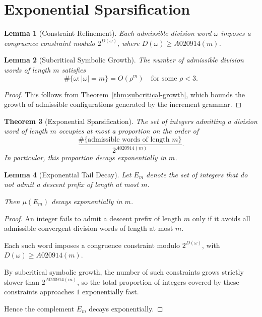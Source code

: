 \documentclass[12pt, oneside]{article}
\numberwithin{equation}{section}
\theoremstyle{definition}
\theoremstyle{plain}
\newtheorem{theorem}{Theorem}[section]
\newtheorem{lemma}[theorem]{Lemma}
\theoremstyle{remark}
\begin{document}
\section{Exponential Sparsification}
\label{sec:exponential-sparsification}

\begin{lemma}[Constraint Refinement]
Each admissible division word $\omega$ imposes a congruence constraint
modulo $2^{D(\omega)}$, where $D(\omega) \ge A020914(m)$.
\end{lemma}

\begin{lemma}[Subcritical Symbolic Growth]
The number of admissible division words of length $m$ satisfies
\[
\#\{\omega : |\omega|=m\} = O(\rho^m)
\quad \text{for some } \rho < 3.
\]
\end{lemma}

\begin{proof}
This follows from Theorem~\ref{thm:subcritical-growth}, which bounds the growth
of admissible configurations generated by the increment grammar.
\end{proof}

\begin{theorem}[Exponential Sparsification]
The set of integers admitting a division word of length $m$ occupies at most
a proportion on the order of
\[
\frac{\#\{\text{admissible words of length } m\}}{2^{A020914(m)}}.
\]
In particular, this proportion decays exponentially in $m$.
\end{theorem}

\begin{lemma}[Exponential Tail Decay]
Let $E_m$ denote the set of integers that do not admit a descent prefix
of length at most $m$.

Then $\mu(E_m)$ decays exponentially in $m$.
\end{lemma}

\begin{proof}
An integer fails to admit a descent prefix of length $m$ only if it avoids
all admissible convergent division words of length at most $m$.

Each such word imposes a congruence constraint modulo $2^{D(\omega)}$,
with $D(\omega) \ge A020914(m)$.

By subcritical symbolic growth, the number of such constraints grows
strictly slower than $2^{A020914(m)}$, so the total proportion of integers
covered by these constraints approaches $1$ exponentially fast.

Hence the complement $E_m$ decays exponentially.
\end{proof}
\end{document}
